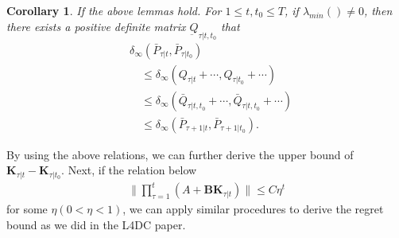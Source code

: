 \documentclass[letterpaper, 10 pt, conference]{ieeeconf}  %
\newcommand{\transpose}{\mathsf{T}}
\newtheorem{corollary}{Corollary}
\begin{document}


\begin{corollary}
    If the above lemmas hold. For $1\leq t, t_{0} \leq T$, 
    if $\lambda_{min}() \neq 0$, then there exists a positive definite matrix $\underbar{Q}_{\tau|t,t_{0}}$ that
    \begin{align*}
        &\delta_{\infty}(\bar{P}_{\tau|t},\bar{P}_{\tau|t_{0}})\\
        &\quad \leq \delta_{\infty}(Q_{\tau|t}+\cdots,Q_{\tau|t_{0}}+\cdots)\\
        &\quad \leq \delta_{\infty}(\bar{Q}_{\tau|t,t_{0}}+\cdots,\bar{Q}_{\tau|t,t_{0}}+\cdots)\\
        &\quad \leq \delta_{\infty}(\bar{P}_{\tau+1|t},\bar{P}_{\tau+1|t_{0}}).
    \end{align*}
\end{corollary}
By using the above relations, we can further derive the upper bound of $\mathbf{K}_{\tau|t} - \mathbf{K}_{\tau|t_{0}}$. Next, if the relation below
\begin{align*}
    \|\prod_{\tau = 1}^{t} (A+\mathbf{B}\mathbf{K}_{\tau|t})\| \leq C\eta^{t}
\end{align*}
for some $\eta(0<\eta<1)$, we can apply similar procedures to derive the regret bound as we did in the L4DC paper.
\end{document}
